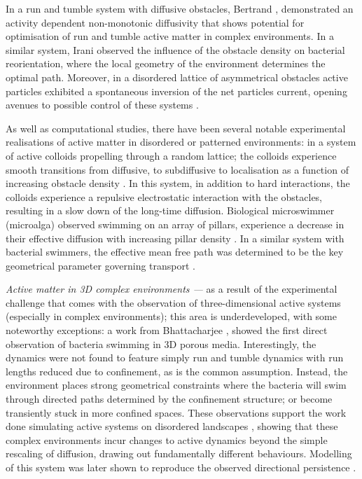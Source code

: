 In a run and tumble system with diffusive obstacles, Bertrand \etal \cite{bertrand2018}, demonstrated an activity dependent non-monotonic diffusivity that shows potential for optimisation of run and tumble active matter in complex environments. In a similar system, Irani \etal \cite{irani2022} observed the influence of the obstacle density on bacterial reorientation, where the local geometry of the environment determines the optimal path. 
Moreover, in a disordered lattice of asymmetrical obstacles active particles exhibited a spontaneous inversion of the net particles current, opening avenues to possible control of these systems \cite{borba2020}.

 
 As well as computational studies, there have been several notable experimental realisations of active matter in disordered or patterned environments: in a system of active colloids propelling through a random lattice; the colloids experience smooth transitions from diffusive, to subdiffusive to localisation as a function of increasing obstacle density \cite{morin2017}. In this system, in addition to hard interactions, the colloids experience a repulsive electrostatic interaction with the obstacles, resulting in a slow down of the long-time diffusion. Biological microswimmer (microalga) observed swimming on an array of pillars, experience a decrease in their effective diffusion with increasing pillar density \cite{brun-cosme-bruny2019}. In a similar system with bacterial swimmers, the effective mean free path was determined to be the key geometrical parameter governing transport \cite{dehkharghani2022}. 
  
 
 \textit{Active matter in 3D complex environments ---} as a result of the experimental challenge that comes with the observation of three-dimensional active systems (especially in complex environments); this area is underdeveloped, with some noteworthy exceptions: a work from Bhattacharjee \etal \cite{bhattacharjee2019}, showed the first direct observation of bacteria swimming in 3D porous media. Interestingly, the dynamics were not found to feature simply run and tumble dynamics with run lengths reduced due to confinement, as is the common assumption. Instead, the environment places strong geometrical constraints where the bacteria will swim through directed paths determined by the confinement structure; or become transiently stuck in more confined spaces. These observations support the work done simulating active systems on disordered landscapes \cite{zeitz2017,reichhardt2014,bechinger2016a,reichhardt2018b}, showing that these complex environments incur changes to active dynamics beyond the simple rescaling of diffusion, drawing out fundamentally different behaviours. Modelling of this system was later shown to reproduce the observed directional persistence \cite{perez2021}.
 
